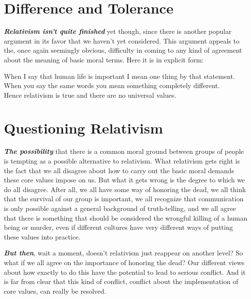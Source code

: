 \documentclass[12pt, openany]{book}
\makeatletter
\newenvironment{kframe}{%
\medskip{}
\setlength{\fboxsep}{.8em}
 \def\at@end@of@kframe{}%
 \ifinner\ifhmode%
  \def\at@end@of@kframe{\end{minipage}}%
  \begin{minipage}{\columnwidth}%
 \fi\fi%
 \def\FrameCommand##1{\hskip\@totalleftmargin \hskip-\fboxsep
 \colorbox{shadecolor}{##1}\hskip-\fboxsep
     \hskip-\linewidth \hskip-\@totalleftmargin \hskip\columnwidth}%
 \MakeFramed {\advance\hsize-\width
   \@totalleftmargin\z@ \linewidth\hsize
   \@setminipage}}%
 {\par\unskip\endMakeFramed%
 \at@end@of@kframe}
\newenvironment{rmdblock}[1]
  {
  \begin{itemize}
  \renewcommand{\labelitemi}{
    \raisebox{-.7\height}[0pt][0pt]{
      {\setkeys{Gin}{width=3em,keepaspectratio}\texttt{[image: img/\#1]}}
    }
  }
  \setlength{\fboxsep}{1em}
  \begin{kframe}
  \item
  }
  {
  \end{kframe}
  \end{itemize}
  }
\newenvironment{caution}
  {\begin{rmdblock}{caution}}
  {\end{rmdblock}}
\makeatother
\begin{document}
\hypertarget{difference-and-tolerance}{%
\section{Difference and Tolerance}\label{difference-and-tolerance}}

\textbf{\emph{Relativism isn't quite finished}} yet though, since there is another popular argument in its favor that we haven't yet considered. This argument appeals to the, once again seemingly obvious, difficulty in coming to any kind of agreement about the meaning of basic moral terms. Here it is in explicit form:

\begin{center}

\begin{argument}

When I say that human life is important I mean one thing by that statement.\\
When you say the same words you mean something completely different.\\

Hence relativism is true and there are no universal values.

\end{argument}

\end{center}

\hypertarget{questioning-relativism}{%
\section{Questioning Relativism}\label{questioning-relativism}}

\textbf{\emph{The possibility}} that there is a common moral ground between groups of people is tempting as a possible alternative to relativism. What relativism gets right is the fact that we all disagree about how to carry out the basic moral demands these core values impose on us. But what it gets wrong is the degree to which we do all disagree. After all, we all have some way of honoring the dead, we all think that the survival of our group is important, we all recognize that communication is only possible against a general background of truth-telling, and we all agree that there is something that should be considered the wrongful killing of a human being or murder, even if different cultures have very different ways of putting these values into practice.

\begin{caution}

\textbf{\emph{But then}}, wait a moment, doesn't relativism just reappear on another level? So what if we all agree on the importance of honoring the dead? Our different views about how exactly to do this have the potential to lead to serious conflict. And it is far from clear that this kind of conflict, conflict about the implementation of core values, can really be resolved.

\end{caution}
\end{document}
